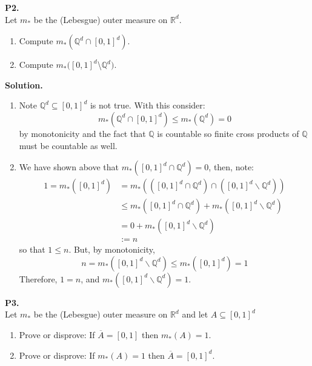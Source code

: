 \documentclass{article}
\begin{document}
    \textbf{P2.} \\

    Let $m_*$ be the (Lebesgue) outer measure on $\mathbb{R}^d$.
    \begin{enumerate}
        \item Compute $m_*(\mathbb{Q}^d\cap [0,1]^d)$.
        \item Compute $m_*([0,1]^d$\textbackslash$\mathbb{Q}^d)$.
    \end{enumerate}

    \textbf{Solution.}
    \begin{enumerate}
        \item Note $\mathbb{Q}^d\subseteq[0,1]^d$ is not true. With this consider:
            \[ m_*(\mathbb{Q}^d\cap[0,1]^d) \leq m_*(\mathbb{Q}^d) = 0 \]
            by monotonicity and the fact that $\mathbb{Q}$ is countable so finite cross products of $\mathbb{Q}$ must be countable
            as well.
        \item We have shown above that $m_*([0,1]^d\cap\mathbb{Q}^d) = 0$, then, note:
            \begin{align*}
                1 = m_*([0,1]^d) &= m_*(([0,1]^d\cap\mathbb{Q}^d)\cap([0,1]^d\backslash\mathbb{Q}^d)) \\
                &\leq m_*([0,1]^d \cap \mathbb{Q}^d) + m_*([0,1]^d\backslash\mathbb{Q}^d) \\
                &= 0 + m_*([0,1]^d\backslash\mathbb{Q}^d)\\
                &:= n
            \end{align*}
            so that $1\leq n$. But, by monotonicity,
            \[ n = m_*([0,1]^d\backslash\mathbb{Q}^d) \leq m_*([0,1]^d) = 1 \]
            Therefore, $1 = n$, and $m_*([0,1]^d\backslash\mathbb{Q}^d) = 1$.
    \end{enumerate}

    \textbf{P3.} \\

    Let $m_*$ be the (Lebesgue) outer measure on $\mathbb{R}^d$ and let $A\subseteq[0,1]^d$
    \begin{enumerate}
        \item Prove or disprove: If $\overline{A} = [0,1]$ then $m_*(A) = 1$.
        \item Prove or disprove: If $m_*(A) = 1$ then $\overline{A} = [0,1]^d$.
    \end{enumerate}
\end{document}
